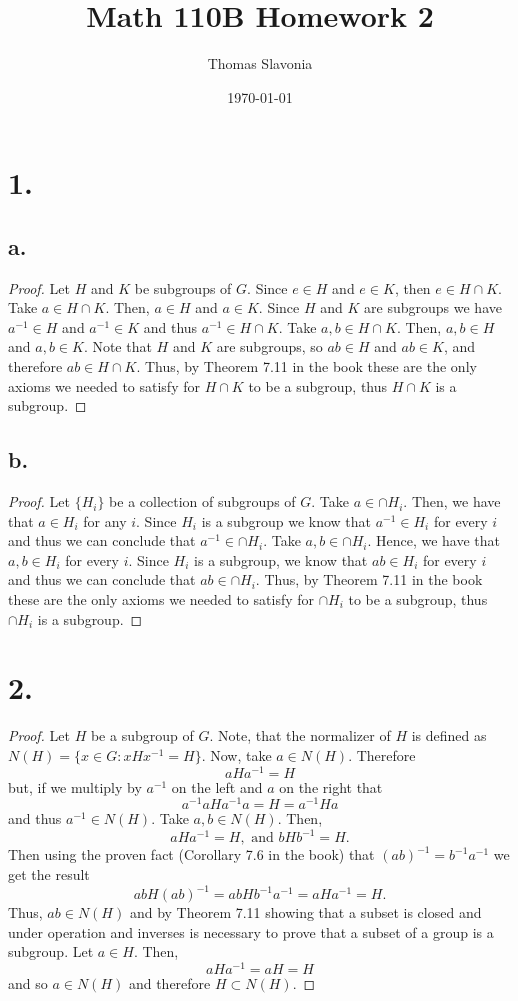 \documentclass{article}
\title{Math 110B Homework 2}
\author{Thomas Slavonia}
\date{\today}
\begin{document}
\maketitle
\section*{1.}
\subsection*{a.}
\begin{proof}
  Let $H$ and $K$ be subgroups of $G$. Since $e \in H$ and $e \in K$, then $e \in H \cap K$. Take $a \in H \cap K$. Then, $a \in H$ and $a \in K$. Since $H$ and $K$ are subgroups we have $a^{-1} \in H$ and $a^{-1} \in K$ and thus $a^{-1} \in H \cap K$. Take $a, b \in H \cap K$. Then, $a, b \in H$ and $a, b \in K$. Note that $H$ and $K$ are subgroups, so $ab \in H$ and $ab \in K$, and therefore $ab \in H \cap K$. Thus, by Theorem 7.11 in the book these are the only axioms we needed to satisfy for $H \cap K$ to be a subgroup, thus $H \cap K$ is a subgroup. 
\end{proof}
\subsection*{b.}
\begin{proof}
  Let $\{H_i\}$ be a collection of subgroups of $G$. Take $a \in \cap H_i$. Then, we have that $a \in H_i$ for any $i$. Since $H_i$ is a subgroup we know that $a^{-1} \in H_i$ for every $i$ and thus we can conclude that $a^{-1} \in \cap H_i$. Take $a, b \in \cap H_i$. Hence, we have that $a, b \in H_i$ for every $i$. Since $H_i$ is a subgroup, we know that $ab \in H_i$ for every $i$ and thus we can conclude that $ab \in \cap H_i$. Thus, by Theorem 7.11 in the book these are the only axioms we needed to satisfy for $\cap H_i$ to be a subgroup, thus $\cap H_i$ is a subgroup.
\end{proof}
\section*{2.}
\begin{proof}
  Let $H$ be a subgroup of $G$. Note, that the normalizer of $H$ is defined as $N(H) = \{x \in G : xHx^{-1} = H \}$. Now, take $a \in N(H)$. Therefore
  \[
  aHa^{-1} = H  
  \] 
  but, if we multiply by $a^{-1}$ on the left and $a$ on the right that 
  \[
  a^{-1}aHa^{-1}a = H = a^{-1}Ha  
  \]
  and thus $a^{-1} \in N(H)$. Take $a, b \in N(H)$. Then, 
  \[
  aHa^{-1} = H, \text{ and } bHb^{-1} = H.  
  \]
  Then using the proven fact (Corollary 7.6 in the book) that $(ab)^{-1} = b^{-1}a^{-1}$ we get the result
  \[
  abH(ab)^{-1} = abHb^{-1}a^{-1} = aHa^{-1} = H.   
  \]
  Thus, $ab \in N(H)$ and by Theorem 7.11 showing that a subset is closed and under operation and inverses is necessary to prove that a subset of a group is a subgroup. Let $a \in H$. Then, 
  \[
  aHa^{-1} = aH = H  
  \]
  and so $a \in N(H)$ and therefore $H \subset N(H)$. 
\end{proof}
\end{document}
